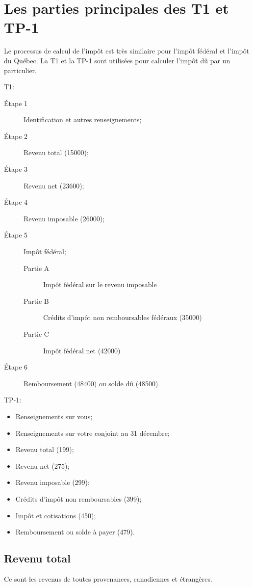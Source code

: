 \section{Les parties principales des T1 et TP-1}
\begin{intro}
	Le processus de calcul de l'impôt est très similaire pour l'impôt fédéral et l'impôt du Québec. La T1 et la TP-1 sont utilisées pour calculer l'impôt dû par un particulier.
\end{intro}
T1:
\ca
\begin{description}
	\item[Étape 1] Identification et autres renseignements;
	\item[Étape 2] Revenu total (15000);
	\item[Étape 3] Revenu net (23600);
	\item[Étape 4] Revenu imposable (26000);
	\item[Étape 5] Impôt fédéral;
	\begin{description}
		\item[Partie A] Impôt fédéral sur le revenu imposable
		\item[Partie B] Crédits d'impôt non remboursables fédéraux (35000)
		\item[Partie C] Impôt fédéral net (42000)
	\end{description}
	\item[Étape 6] Remboursement (48400) ou solde dû (48500).
\end{description}

TP-1:
\qc
\begin{itemize}
	\item Renseignements sur vous;
	\item Renseignements sur votre conjoint au 31 décembre;
	\item Revenu total (199);
	\item Revenu net (275);
	\item Revenu imposable (299);
	\item Crédits d'impôt non remboursables (399);
	\item Impôt et cotisations (450);
	\item Remboursement ou solde à payer (479).
\end{itemize}


\subsection{Revenu total}
Ce sont les revenus de toutes provenances, canadiennes et étrangères.


